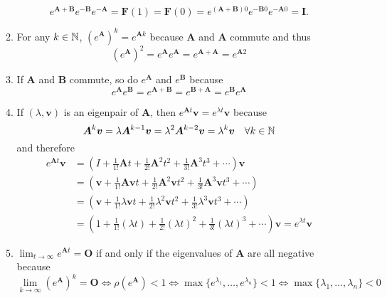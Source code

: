 \documentclass[12pt,a4paper]{article}
\begin{document}
\begin{itemize}
\begin{enumerate}
      \begin{equation}\nonumber%
        e^{\bm{A}+\bm{B}}e^{-\bm{B}}e^{-\bm{A}} = \bm{F}(1) = \bm{F}(0) = e^{(\bm{A}+\bm{B})0}e^{-\bm{B}0}e^{-\bm{A}0} = \bm{I}.
      \end{equation}
    \item For any $k\in \mathbb{N}$, $(e^{\bm{A}})^{k} = e^{\bm{A}k}$ because
      $\bm{A}$ and $\bm{A}$ commute and thus
      \begin{equation}\nonumber%
        (e^{\bm{A}})^{2} = e^{\bm{A}}e^{\bm{A}} = e^{\bm{A}+\bm{A}} = e^{\bm{A}2}
      \end{equation}
      
    \item If $\bm{A}$ and $\bm{B}$ commute, so do $e^{\bm{A}}$ and $e^{\bm{B}}$ because
      \begin{equation}\nonumber%
        e^{\bm{A}}e^{\bm{B}} = e^{\bm{A}+\bm{B}} = e^{\bm{B}+\bm{A}} = e^{\bm{B}}e^{\bm{A}}
      \end{equation}

    \item If $(\lambda, \bm{v})$ is an eigenpair of $\bm{A}$, then
      $e^{\bm{A}t}\bm{v} = e^{\lambda t}\bm{v}$ because
      \begin{equation}\nonumber%
        \bm{A}^{k}\bm{v}
        = \lambda \bm{A}^{k-1}\bm{v}
        = \lambda^{2} \bm{A}^{k-2}\bm{v}
        = \lambda^{k}\bm{v}
        \quad \forall k \in \N
      \end{equation}
      and therefore
      \begin{align}
        e^{\bm{A}t}\bm{v}
          & = \left(I + \frac{1}{1!}\bm{A}t + \frac{1}{2!}\bm{A}^{2}t^{2} + \frac{1}{3!}\bm{A}^{3}t^{3} + \cdots \right)\bm{v}  \nonumber \\
          & = \left(\bm{v} + \frac{1}{1!}\bm{A}\bm{v}t + \frac{1}{2!}\bm{A}^{2}\bm{v}t^{2} + \frac{1}{3!}\bm{A}^{3}\bm{v}t^{3} + \cdots \right)  \nonumber \\
          & = \left(\bm{v} + \frac{1}{1!}\lambda \bm{v} t + \frac{1}{2!}\lambda^{2}\bm{v}t^{2} + \frac{1}{3!}\lambda^{3}\bm{v}t^{3} + \cdots \right)  \nonumber \\
          & = \left(1 + \frac{1}{1!}(\lambda t) + \frac{1}{2!}(\lambda t)^{2} + \frac{1}{3!}(\lambda t)^{3} + \cdots \right)\bm{v} = e^{\lambda t}\bm{v}
      \nonumber%
      \end{align}

    \item $\lim_{t\to\infty}e^{\bm{A}t}=\bm{O}$ if and only if the eigenvalues of $\bm{A}$ are all negative because
      \begin{equation}\nonumber%
        \lim_{k\to\infty} (e^{\bm{A}})^{k}
        = \bm{O}
        \iff
        \rho(e^{\bm{A}})<1
        \iff
        \max\{e^{\lambda_{1}},\ldots, e^{\lambda_{n}}\} <1
        \iff
        \max\{\lambda_{1},\ldots, \lambda_{n}\} < 0
      \end{equation}


\end{enumerate}
\end{itemize}
\end{document}
